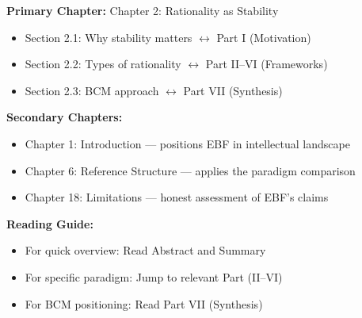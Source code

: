 \begin{tcolorbox}[colback=purple!5!white, colframe=purple!75!black,
    title=\textbf{Chapter Linkages}]

\textbf{Primary Chapter:} Chapter 2: Rationality as Stability
\begin{itemize}[nosep]
    \item Section 2.1: Why stability matters $\leftrightarrow$ Part I (Motivation)
    \item Section 2.2: Types of rationality $\leftrightarrow$ Part II--VI (Frameworks)
    \item Section 2.3: BCM approach $\leftrightarrow$ Part VII (Synthesis)
\end{itemize}

\textbf{Secondary Chapters:}
\begin{itemize}[nosep]
    \item Chapter 1: Introduction --- positions EBF in intellectual landscape
    \item Chapter 6: Reference Structure --- applies the paradigm comparison
    \item Chapter 18: Limitations --- honest assessment of EBF's claims
\end{itemize}

\textbf{Reading Guide:}
\begin{itemize}[nosep]
    \item For quick overview: Read Abstract and Summary
    \item For specific paradigm: Jump to relevant Part (II--VI)
    \item For BCM positioning: Read Part VII (Synthesis)
\end{itemize}

\end{tcolorbox}


